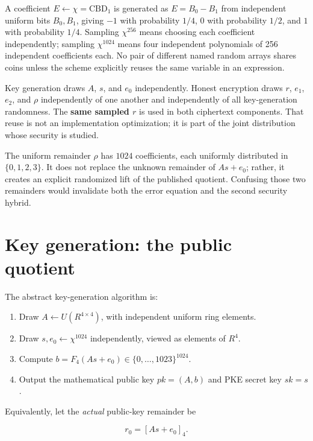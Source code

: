 \documentclass[
  11pt,
  a4paper,
  oneside]{report}
\providecommand{\tightlist}{%
  \setlength{\itemsep}{0pt}\setlength{\parskip}{0pt}}
\begin{document}
A coefficient \(E\leftarrow\chi=\mathrm{CBD}_1\) is generated as
\(E=B_0-B_1\) from independent uniform bits \(B_0,B_1\), giving \(-1\)
with probability \(1/4\), \(0\) with probability \(1/2\), and \(1\) with
probability \(1/4\). Sampling \(\chi^{256}\) means choosing each
coefficient independently; sampling \(\chi^{1024}\) means four
independent polynomials of 256 independent coefficients each. No pair of
different named random arrays shares coins unless the scheme explicitly
reuses the same variable in an expression.

Key generation draws \(A\), \(s\), and \(e_0\) independently. Honest
encryption draws \(r\), \(e_1\), \(e_2\), and \(\rho\) independently of
one another and independently of all key-generation randomness. The
\textbf{same sampled \(r\)} is used in both ciphertext components. That
reuse is not an implementation optimization; it is part of the joint
distribution whose security is studied.

The uniform remainder \(\rho\) has \(1024\) coefficients, each uniformly
distributed in \(\{0,1,2,3\}\). It does not replace the unknown
remainder of \(As+e_0\); rather, it creates an explicit randomized lift
of the published quotient. Confusing those two remainders would
invalidate both the error equation and the second security hybrid.

\section{Key generation: the public
quotient}\label{key-generation-the-public-quotient}

The abstract key-generation algorithm is:

\begin{enumerate}
\def\labelenumi{\arabic{enumi}.}
\tightlist
\item
  Draw \(A\leftarrow U(R^{4\times4})\), with independent uniform ring
  elements.
\item
  Draw \(s,e_0\leftarrow\chi^{1024}\) independently, viewed as elements
  of \(R^4\).
\item
  Compute \(b=F_4(As+e_0)\in\{0,\ldots,1023\}^{1024}\).
\item
  Output the mathematical public key \(pk=(A,b)\) and PKE secret key
  \(sk=s\).
\end{enumerate}

Equivalently, let the \emph{actual} public-key remainder be

\[
r_0=[As+e_0]_4.
\]
\end{document}
